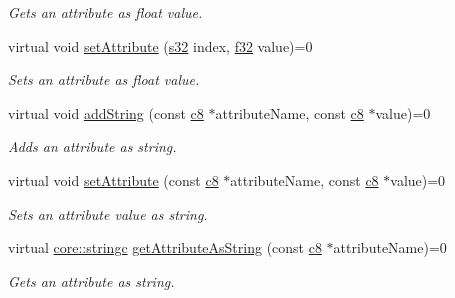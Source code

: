 \begin{DoxyCompactItemize}
\begin{DoxyCompactList}\small\item\em Gets an attribute as float value. \end{DoxyCompactList}\item 
\mbox{\label{classirr_1_1io_1_1IAttributes_a7346bf5c9c2e42c05d5827872e77c51b}} 
virtual void \hyperlink{classirr_1_1io_1_1IAttributes_a7346bf5c9c2e42c05d5827872e77c51b}{set\+Attribute} (\hyperlink{namespaceirr_ac66849b7a6ed16e30ebede579f9b47c6}{s32} index, \hyperlink{namespaceirr_a0277be98d67dc26ff93b1a6a1d086b07}{f32} value)=0
\begin{DoxyCompactList}\small\item\em Sets an attribute as float value. \end{DoxyCompactList}\item 
\mbox{\label{classirr_1_1io_1_1IAttributes_a051f092d809f9d40215a1480d9d69afc}} 
virtual void \hyperlink{classirr_1_1io_1_1IAttributes_a051f092d809f9d40215a1480d9d69afc}{add\+String} (const \hyperlink{namespaceirr_a9395eaea339bcb546b319e9c96bf7410}{c8} $\ast$attribute\+Name, const \hyperlink{namespaceirr_a9395eaea339bcb546b319e9c96bf7410}{c8} $\ast$value)=0
\begin{DoxyCompactList}\small\item\em Adds an attribute as string. \end{DoxyCompactList}\item 
virtual void \hyperlink{classirr_1_1io_1_1IAttributes_a9ff2fbcb3861c59159661aaebc84cb27}{set\+Attribute} (const \hyperlink{namespaceirr_a9395eaea339bcb546b319e9c96bf7410}{c8} $\ast$attribute\+Name, const \hyperlink{namespaceirr_a9395eaea339bcb546b319e9c96bf7410}{c8} $\ast$value)=0
\begin{DoxyCompactList}\small\item\em Sets an attribute value as string. \end{DoxyCompactList}\item 
virtual \hyperlink{namespaceirr_1_1core_ab26a0e0359206b5a694f35c37c829d7f}{core\+::stringc} \hyperlink{classirr_1_1io_1_1IAttributes_a60f395fd008a70cc0531fa038c81f0ea}{get\+Attribute\+As\+String} (const \hyperlink{namespaceirr_a9395eaea339bcb546b319e9c96bf7410}{c8} $\ast$attribute\+Name)=0
\begin{DoxyCompactList}\small\item\em Gets an attribute as string. \end{DoxyCompactList}\item 

\end{DoxyCompactItemize}
